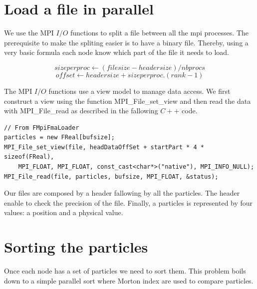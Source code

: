 \documentclass[10pt,letterpaper,titlepage]{report}
\begin{document}

\section{Load a file in parallel}
We use the MPI $I/O$ functions to split a file between all the mpi processes.
The prerequisite to make the spliting easier is to have a binary file.
Thereby, using a very basic formula each node know which part of the file it needs to load.

\begin{equation}
size per proc \leftarrow \left (file size - header size \right ) / nbprocs
\end{equation}
\begin{equation}
offset \leftarrow header size + size per proc .\left ( rank - 1 \right )
\end{equation}
\newline

The MPI $I/O$ functions use a view model to manage data access.
We first construct a view using the function MPI\_File\_set\_view and then read the data with MPI\_File\_read as described in the fallowing $C++$ code.

\begin{lstlisting}
// From FMpiFmaLoader
particles = new FReal[bufsize];
MPI_File_set_view(file, headDataOffSet + startPart * 4 * sizeof(FReal),
	MPI_FLOAT, MPI_FLOAT, const_cast<char*>("native"), MPI_INFO_NULL);
MPI_File_read(file, particles, bufsize, MPI_FLOAT, &status);
\end{lstlisting}

Our files are composed by a header fallowing by all the particles.
The header enable to check the precision of the file.
Finally, a particles is represented by four values: a position and a physical value.


\section{Sorting the particles}
Once each node has a set of particles we need to sort them.
This problem boils down to a simple parallel sort where Morton index are used to compare particles.
\end{document}
